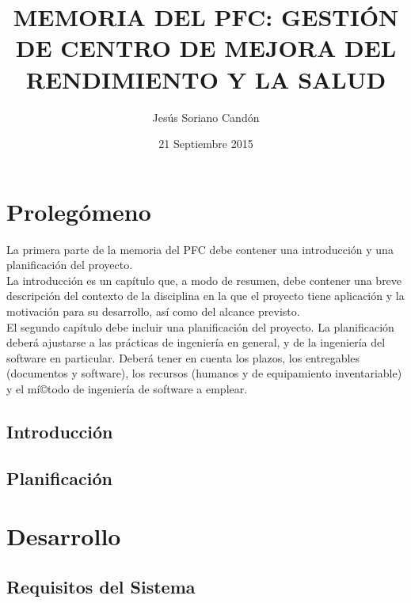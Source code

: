\documentclass[a4paper,11pt]{book}
\title{MEMORIA DEL PFC: GESTIÓN DE CENTRO DE MEJORA DEL RENDIMIENTO Y LA SALUD}
\author{Jesús Soriano Candón}
\date{21 Septiembre 2015}
\begin{document}
\pagestyle{empty}


\cleardoublepage


\cleardoublepage


\newpage


\newpage


\frontmatter

\tableofcontents
\listoffigures
\listoftables

\mainmatter

\part{Prolegómeno}
\null\vfill
\noindent La primera parte de la memoria del PFC debe contener una introducción y una planificación del proyecto.\\

La introducción es un capí­tulo que, a modo de resumen, debe contener una breve descripción del contexto de la disciplina en la que el proyecto tiene aplicación y la motivación para su desarrollo, así­ como del alcance previsto.\\

El segundo capí­tulo debe incluir una planificación del proyecto. La planificación deberá ajustarse a las prácticas de ingenierí­a en general, y de la ingenierí­a del software en particular. Deberá tener en cuenta los plazos, los entregables (documentos y software), los recursos (humanos y de equipamiento inventariable) y el mí©todo de ingenierí­a de software a emplear.
\\

\chapter{Introducción}


\chapter{Planificación}


\part{Desarrollo}
\null\vfill

\chapter{Requisitos del Sistema}

\end{document}
